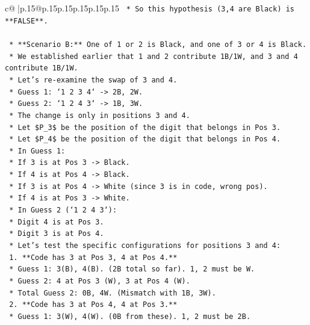 \documentclass{article}
\begin{document}
{\begin{supertabular}{c@{$\;$}|p{.15\linewidth}@{}p{.15\linewidth}p{.15\linewidth}p{.15\linewidth}p{.15\linewidth}p{.15\linewidth}}
{{{\texttt{                    *   So this hypothesis (3,4 are Black) is **FALSE**.} \\
\\ 
\texttt{    *   **Scenario B:** One of 1 or 2 is Black, and one of 3 or 4 is Black.} \\
\texttt{        *   We established earlier that 1 and 2 contribute 1B/1W, and 3 and 4 contribute 1B/1W.} \\
\texttt{        *   Let's re{-}examine the swap of 3 and 4.} \\
\texttt{        *   Guess 1: `1 2 3 4` {-}> 2B, 2W.} \\
\texttt{        *   Guess 2: `1 2 4 3` {-}> 1B, 3W.} \\
\texttt{        *   The change is only in positions 3 and 4.} \\
\texttt{        *   Let \$P\_3\$ be the position of the digit that belongs in Pos 3.} \\
\texttt{        *   Let \$P\_4\$ be the position of the digit that belongs in Pos 4.} \\
\texttt{        *   In Guess 1:} \\
\texttt{            *   If 3 is at Pos 3 {-}> Black.} \\
\texttt{            *   If 4 is at Pos 4 {-}> Black.} \\
\texttt{            *   If 3 is at Pos 4 {-}> White (since 3 is in code, wrong pos).} \\
\texttt{            *   If 4 is at Pos 3 {-}> White.} \\
\texttt{        *   In Guess 2 (`1 2 4 3`):} \\
\texttt{            *   Digit 4 is at Pos 3.} \\
\texttt{            *   Digit 3 is at Pos 4.} \\
\texttt{        *   Let's test the specific configurations for positions 3 and 4:} \\
\texttt{            1.  **Code has 3 at Pos 3, 4 at Pos 4.**} \\
\texttt{                *   Guess 1: 3(B), 4(B). (2B total so far). 1, 2 must be W.} \\
\texttt{                *   Guess 2: 4 at Pos 3 (W), 3 at Pos 4 (W).} \\
\texttt{                *   Total Guess 2: 0B, 4W. (Mismatch with 1B, 3W).} \\
\texttt{            2.  **Code has 3 at Pos 4, 4 at Pos 3.**} \\
\texttt{                *   Guess 1: 3(W), 4(W). (0B from these). 1, 2 must be 2B.} \\
}}}
\end{supertabular}}
\end{document}
